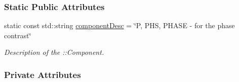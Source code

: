 \subsubsection*{Static Public Attributes}
\begin{DoxyCompactItemize}
\item 
static const std::string \hyperlink{classIPCprocess_a7d0959bdc6ab6fb43f1d7d8d0f4ad4ac}{componentDesc} = \char`\"{}P, PHS, PHASE -\/ for the phase contrast\char`\"{}
\begin{DoxyCompactList}\small\item\em Description of the ::Component. \item\end{DoxyCompactList}\end{DoxyCompactItemize}
\subsubsection*{Private Attributes}
